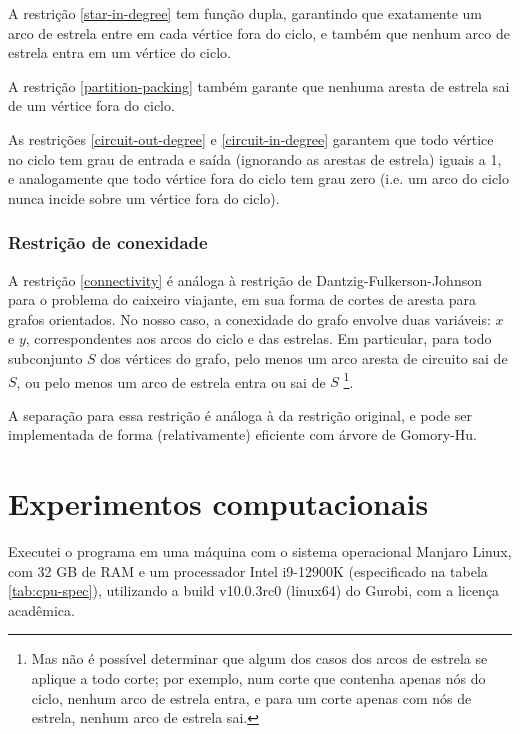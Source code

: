 \documentclass{article}
\begin{document}
A restrição \ref{star-in-degree} tem função dupla, garantindo que exatamente um arco de estrela entre em cada vértice fora do ciclo, e também que nenhum arco de estrela entra em um vértice do ciclo.

A restrição \ref{partition-packing} também garante que nenhuma aresta de estrela sai de um vértice fora do ciclo.

As restrições \ref{circuit-out-degree}  e \ref{circuit-in-degree} garantem que todo vértice no ciclo tem grau de entrada e saída (ignorando as arestas de estrela) iguais a 1, e analogamente que todo vértice fora do ciclo tem grau zero (i.e. um arco do ciclo nunca incide sobre um vértice fora do ciclo).

\subsubsection{Restrição de conexidade}

A restrição \ref{connectivity} é análoga à restrição de Dantzig-Fulkerson-Johnson para o problema do caixeiro viajante, em sua forma de cortes de aresta para grafos orientados. No nosso caso, a conexidade do grafo envolve duas variáveis: $x$ e $y$, correspondentes aos arcos do ciclo e das estrelas. Em particular, para todo subconjunto $S$ dos vértices do grafo, pelo menos um arco aresta de circuito sai de $S$, ou pelo menos um arco de estrela entra ou sai de $S$ \footnote{Mas não é possível determinar que algum dos casos dos arcos de estrela se aplique a todo corte; por exemplo, num corte que contenha apenas nós do ciclo, nenhum arco de estrela entra, e para um corte apenas com nós de estrela, nenhum arco de estrela sai.}.

A separação para essa restrição é análoga à da restrição original, e pode ser implementada de forma (relativamente) eficiente com árvore de Gomory-Hu.

\section{Experimentos computacionais}

Executei o programa em uma máquina com o sistema operacional Manjaro Linux, com 32 GB de RAM e um processador Intel i9-12900K (especificado na tabela \ref{tab:cpu-spec}), utilizando a build v10.0.3rc0 (linux64) do Gurobi, com a licença acadêmica.
\end{document}
